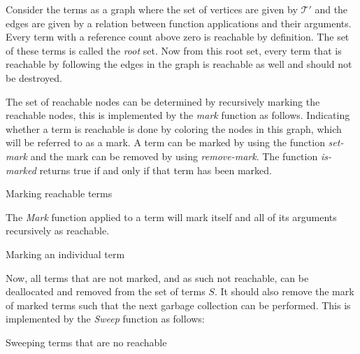 \documentclass[10pt,a4paper]{article}
\newcommand{\terms}{\mathcal{T}}
\begin{document}
\noindent Consider the terms as a graph where the set of vertices are given by $\terms'$ and the edges are given by a relation between function applications and their arguments.
Every term with a reference count above zero is reachable by definition.
The set of these terms is called the \emph{root} set.
Now from this root set, every term that is reachable by following the edges in the graph is reachable as well and should not be destroyed.

The set of reachable nodes can be determined by recursively marking the reachable nodes, this is implemented by the \emph{mark} function as follows.
Indicating whether a term is reachable is done by coloring the nodes in this graph, which will be referred to as a mark.
A term can be marked by using the function \emph{set-mark} and the mark can be removed by using \emph{remove-mark}.
The function \emph{is-marked} returns true if and only if that term has been marked.

\begin{algorithm}[H]
  \caption{Marking reachable terms}\label{alg:mark}
  \begin{algorithmic}[1]
      \EndIf
    \EndFor
    \EndProcedure
  \end{algorithmic}
\end{algorithm}

\noindent The \emph{Mark} function applied to a term will mark itself and all of its arguments recursively as reachable.

\begin{algorithm}[H]
  \caption{Marking an individual term}\label{alg:markterm}
  \begin{algorithmic}[1]
    \Procedure{Mark}{$t : \terms'$}
    
      \EndFor
    \EndIf
    \EndProcedure
  \end{algorithmic}
\end{algorithm}

\noindent Now, all terms that are not marked, and as such not reachable, can be deallocated and removed from the set of terms $S$.
It should also remove the mark of marked terms such that the next garbage collection can be performed.
This is implemented by the \emph{Sweep} function as follows:

\begin{algorithm}[H]
  \caption{Sweeping terms that are no reachable}\label{alg:sweep}
  \begin{algorithmic}[1]
      \Else
      \EndIf
    \EndFor
    \EndProcedure
  \end{algorithmic}
\end{algorithm}
\end{document}
